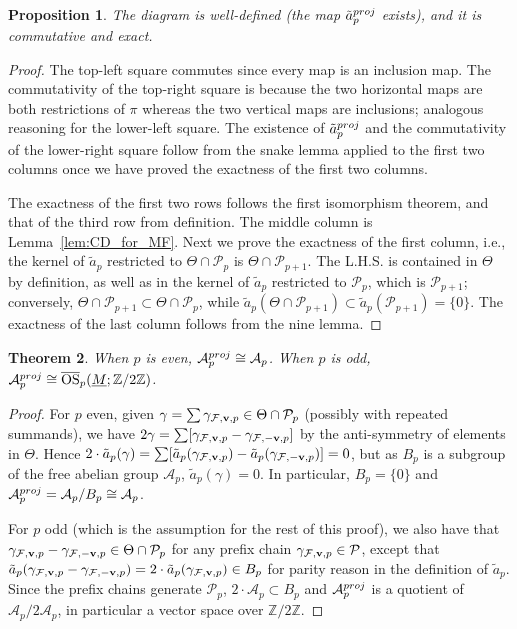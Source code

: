 \documentclass{amsart}
\newtheorem{theorem}{Theorem}[section]
\newtheorem{proposition}[theorem]{Proposition}
\newcommand\Acal{{\mathcal A}}
\newcommand\Fcal{{\mathcal F}}
\newcommand\Pcal{{\mathcal P}}
\newcommand\vv{{\bf v}}
\newcommand\Ztwo{{\mathbb Z}/2{\mathbb Z}}
\newcommand\pj{{\rm proj}}
\DeclareMathOperator{\OS}{OS}
\begin{document}
{\begin{proposition}
    The diagram is well-defined (the map $\tilde{a}_p^\pj$ exists), and it is commutative and exact.
\end{proposition}

\begin{proof}
The top-left square commutes since every map is an inclusion map. The commutativity of the top-right square is because the two horizontal maps are both restrictions of $\pi$ whereas the two vertical maps are inclusions; analogous reasoning for the lower-left square.
The existence of $\tilde{a}_p^\pj$ and the commutativity of the lower-right square follow from the snake lemma applied to the first two columns once we have proved the exactness of the first two columns.

The exactness of the first two rows follows the first isomorphism theorem, and that of the third row from definition. The middle column is Lemma~\ref{lem:CD_for_MF}. 
Next we prove the exactness of the first column, i.e., the kernel of $\tilde{a}_p$ restricted to $\Theta\cap\Pcal_p$ is $\Theta\cap\Pcal_{p+1}$. The L.H.S. is contained in $\Theta$ by definition, as well as in the kernel of $\tilde{a}_p$ restricted to $\Pcal_p$, which is $\Pcal_{p+1}$; conversely, $\Theta\cap\Pcal_{p+1}\subset\Theta\cap\Pcal_p$, while $\tilde{a}_p(\Theta\cap\Pcal_{p+1})\subset \tilde{a}_p(\Pcal_{p+1})=\{0\}$. The exactness of the last column follows from the nine lemma.
\end{proof}

\begin{theorem}
    When $p$ is even, $\Acal_p^\pj\cong \Acal_p$. When $p$ is odd, $\Acal_p^\pj\cong\overline{\OS}_p(\underline{M}; \Ztwo)$. 
\end{theorem}

\begin{proof}
    For $p$ even, given $\gamma=\sum \gamma_{\Fcal,\vv,p}\in\Theta\cap\Pcal_p$ (possibly with repeated summands), we have $2\gamma=\sum [\gamma_{\Fcal,\vv,p}-\gamma_{\Fcal,-\vv,p}]$ by the anti-symmetry of elements in $\Theta$. Hence $2\cdot \tilde{a}_p(\gamma)=\sum [\tilde{a}_p(\gamma_{\Fcal,\vv,p})-\tilde{a}_p(\gamma_{\Fcal,-\vv,p})]=0$, but as $B_p$ is a subgroup of the free abelian group $\Acal_p$, $\tilde{a}_p(\gamma)=0$. In particular, $B_p=\{0\}$ and $\Acal_p^\pj = \Acal_p/B_p\cong \Acal_p$.

    For $p$ odd (which is the assumption for the rest of this proof), we also have that $\gamma_{\Fcal,\vv,p}-\gamma_{\Fcal,-\vv,p}\in\Theta\cap\Pcal_p$ for any prefix chain $\gamma_{\Fcal,\vv,p}\in\Pcal$, except that $\tilde{a}_p(\gamma_{\Fcal,\vv,p}-\gamma_{\Fcal,-\vv,p})=2\cdot \tilde{a}_p(\gamma_{\Fcal,\vv,p})\in B_p$ for parity reason in the definition of $\tilde{a}_p$. Since the prefix chains generate $\Pcal_p$, $2\cdot \Acal_p\subset B_p$ and $\Acal_p^\pj$ is a quotient of $\Acal_p/2\Acal_p$, in particular a vector space over $\Ztwo$.
  

\end{proof}}
\end{document}
